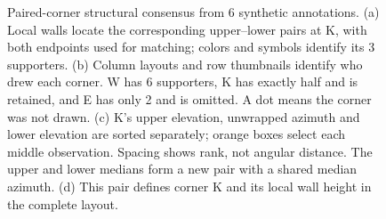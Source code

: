 \begin{figure}[t]
\centering
\setcounter{subfigure}{0}
\begin{minipage}{170mm}
\hfill
{}
\par\vspace{1pt}
\hfill
{}
\end{minipage}
\caption{Paired-corner structural consensus from 6 synthetic annotations. (a) Local walls locate the corresponding upper--lower pairs at K, with both endpoints used for matching; colors and symbols identify its 3 supporters. (b) Column layouts and row thumbnails identify who drew each corner. W has 6 supporters, K has exactly half and is retained, and E has only 2 and is omitted. A dot means the corner was not drawn. (c) K's upper elevation, unwrapped azimuth and lower elevation are sorted separately; orange boxes select each middle observation. Spacing shows rank, not angular distance. The upper and lower medians form a new pair with a shared median azimuth. (d) This pair defines corner K and its local wall height in the complete layout.}
\label{fig:consensus-steps}
\end{figure}
